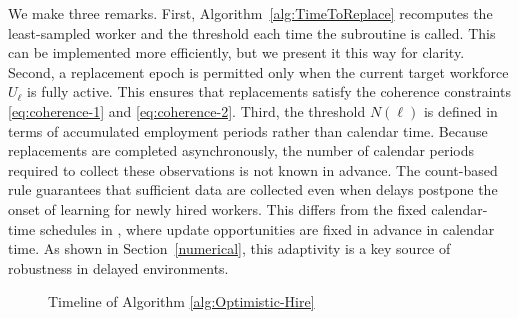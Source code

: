 \documentclass[opre,blindrev]{informs3}
\begin{document}
We make three remarks. First, Algorithm~\ref{alg:TimeToReplace} recomputes the least-sampled worker and the threshold each time the subroutine is called. This can be implemented more efficiently, but we present it this way for clarity. Second, a replacement epoch is permitted only when the current target workforce \(U_\ell\) is fully active. This ensures that replacements satisfy the coherence constraints \eqref{eq:coherence-1} and \eqref{eq:coherence-2}. Third, the threshold \(N(\ell)\) is defined in terms of accumulated employment periods rather than calendar time. Because replacements are completed asynchronously, the number of calendar periods required to collect these observations is not known in advance. The count-based rule guarantees that sufficient data are collected even when delays postpone the onset of learning for newly hired workers. This differs from the fixed calendar-time schedules in \cite{agrawal1990switching, gao2019batched, perchet2016batched}, where update opportunities are fixed in advance in calendar time. As shown in Section~\ref{numerical}, this adaptivity is a key source of robustness in delayed environments.

\begin{figure}[H]
    \centering
    \caption{Timeline of Algorithm \ref{alg:Optimistic-Hire}}
    \label{fig:intro-timeline}
\end{figure}
\end{document}
